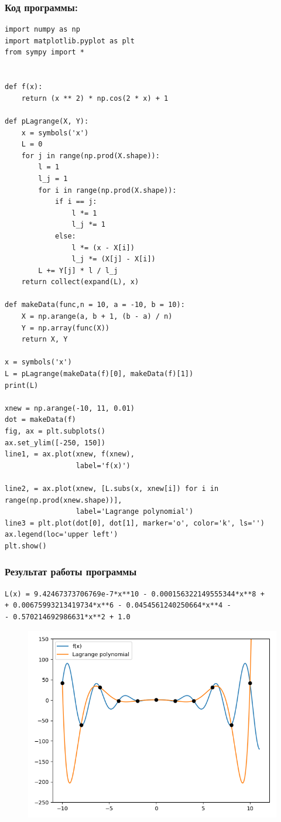 \documentclass[12pt,a4paper]{article}
\begin{document}
\subsubsection{Код программы:}
\begin{verbatim}
import numpy as np
import matplotlib.pyplot as plt
from sympy import *


def f(x):
    return (x ** 2) * np.cos(2 * x) + 1

def pLagrange(X, Y):
    x = symbols('x')
    L = 0
    for j in range(np.prod(X.shape)):
        l = 1
        l_j = 1
        for i in range(np.prod(X.shape)):
            if i == j:
                l *= 1
                l_j *= 1
            else:
                l *= (x - X[i])
                l_j *= (X[j] - X[i])
        L += Y[j] * l / l_j
    return collect(expand(L), x)

def makeData(func,n = 10, a = -10, b = 10):
    X = np.arange(a, b + 1, (b - a) / n)
    Y = np.array(func(X))
    return X, Y

x = symbols('x')
L = pLagrange(makeData(f)[0], makeData(f)[1])
print(L)

xnew = np.arange(-10, 11, 0.01)
dot = makeData(f)
fig, ax = plt.subplots()
ax.set_ylim([-250, 150])
line1, = ax.plot(xnew, f(xnew),
                 label='f(x)')

line2, = ax.plot(xnew, [L.subs(x, xnew[i]) for i in range(np.prod(xnew.shape))],
                 label='Lagrange polynomial')
line3 = plt.plot(dot[0], dot[1], marker='o', color='k', ls='')
ax.legend(loc='upper left')
plt.show()
\end{verbatim}

\subsubsection{Результат работы программы}
\begin{verbatim}
L(x) = 9.42467373706769e-7*x**10 - 0.000156322149555344*x**8 + 
+ 0.00675993213419734*x**6 - 0.0454561240250664*x**4 - 
- 0.570214692986631*x**2 + 1.0
\end{verbatim}

\begin{figure}[h]
\includegraphics[width=\linewidth]{L(f)1.PNG}
\caption{}
\label{fig:}
\end{figure}
\vspace{5cm}
\end{document}

